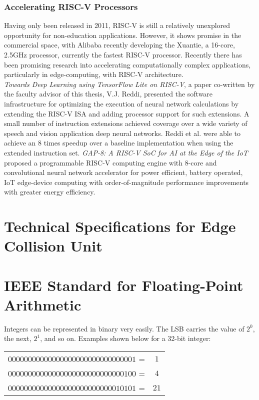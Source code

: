     \subsubsection{Accelerating RISC-V Processors}
    Having only been released in 2011, RISC-V is still a relatively unexplored opportunity for non-education applications. However, it shows promise in the commercial space, with Alibaba recently developing the Xuantie, a 16-core, 2.5GHz processor, currently the fastest RISC-V processor. Recently there has been promising research into accelerating computationally complex applications, particularly in edge-computing, with RISC-V architecture. \\
    \textit{Towards Deep Learning using TensorFlow Lite on RISC-V}, a paper co-written by the faculty advisor of this thesis, V.J. Reddi, presented the software infrastructure for optimizing the execution of neural network calculations by extending the RISC-V ISA and adding processor support for such extensions. A small number of instruction extensions achieved coverage over a wide variety of speech and vision application deep neural networks. Reddi et al. were able to achieve an 8 times speedup over a baseline implementation when using the extended instruction set.
    \textit{GAP-8: A RISC-V SoC for AI at the Edge of the IoT} proposed a programmable RISC-V computing engine with 8-core and convolutional neural network accelerator for power efficient, battery operated, IoT edge-device computing with order-of-magnitude performance improvements with greater energy efficiency. \\

\section{Technical Specifications for Edge Collision Unit}
    

\newpage
\section{IEEE Standard for Floating-Point Arithmetic}
\label{section:honeybee_appendix_ieee}
    Integers can be represented in binary very easily. The \gls{LSB} carries the value of $2^0$, the next, $2^1$, and so on. Examples shown below for a 32-bit integer:\\

    \begin{centering}
    \begin{tabular}{c c}
    $00000000 00000000 00000000 00000001$ = & $1$ \\
    $00000000 00000000 00000000 00000100$ = & $4$ \\
    $00000000 00000000 00000000 00010101$ = & $21$ \\
    \end{tabular}
    \end{centering}

